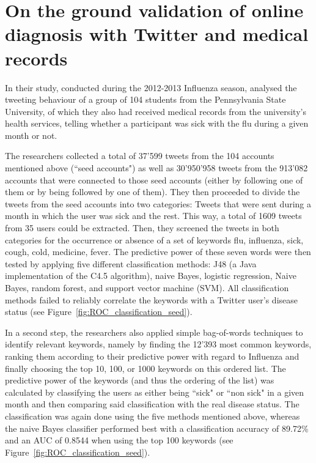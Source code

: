 \documentclass[11pt, a4paper,twoside]{report}\usepackage[]{graphicx}\usepackage[]{color}
\begin{document}
\section[On the ground validation of online diagnosis]{On the ground validation of online diagnosis with Twitter and medical records}
\label{sec:on_the_ground}
In their study, conducted during the 2012-2013 Influenza season, \cite{bodnar_ground_2014} analysed the tweeting behaviour of a group of 104 students from the Pennsylvania State University, of which they also had received medical records from the university's health services, telling whether a participant was sick with the flu during a given month or not.

The researchers collected a total of 37'599 tweets from the 104 accounts mentioned above (``seed accounts") as well as 30'950'958 tweets from the 913'082 accounts that were connected to those seed accounts (either by following one of them or by being followed by one of them). They then proceeded to divide the tweets from the seed accounts into two categories: Tweets that were sent during a month in which the user was sick and the rest. This way, a total of 1609 tweets from 35 users could be extracted. 
Then, they screened the tweets in both categories for the occurrence or absence of a set of keywords {flu, influenza, sick, cough, cold, medicine, fever}. The predictive power of these seven words were then tested by applying five different classification methods: J48 (a Java implementation of the C4.5 algorithm), naive Bayes, logistic regression, Naive Bayes, random forest, and support vector machine (SVM). All classification methods failed to reliably correlate the keywords with a Twitter user's disease status (see Figure~\ref{fig:ROC_classification_seed}).

In a second step, the researchers also applied simple bag-of-words techniques to identify relevant keywords, namely by finding the 12'393 most common keywords, ranking them according to their predictive power with regard to Influenza and finally choosing the top 10, 100, or 1000 keywords on this ordered list. The predictive power of the keywords (and thus the ordering of the list) was calculated by classifying the users as either being ``sick" or ``non sick" in a given month and then comparing said classification with the real disease status. The classification was again done using the five methods mentioned above, whereas the naive Bayes classifier performed best with a classification accuracy of 89.72\% and an AUC of 0.8544 when using the top 100 keywords (see Figure~\ref{fig:ROC_classification_seed}).
\end{document}
